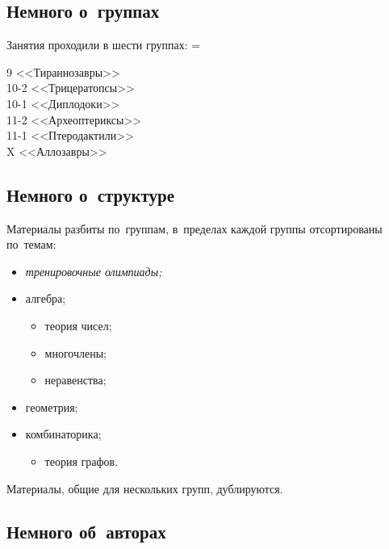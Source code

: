 


\begingroup
\providecommand\ifsourcelinks{\iffalse}
\providecommand\url{\texttt}

\strut

\vfill

\vfill

\strut

\clearpage


\subsection*{Немного о~группах}

Занятия проходили в шести группах:
\begingroup\multicolsep=\parskip
\begin{multicols}{3}
9    <<Тираннозавры>>
\\
10-2 <<Трицератопсы>>
\\
10-1 <<Диплодоки>>
\\
11-2 <<Археоптериксы>>
\\
11-1 <<Птеродактили>>
\\
X    <<Аллозавры>>
\end{multicols}
\endgroup


\subsection*{Немного о~структуре}

Материалы разбиты по~группам, в~пределах каждой группы отсортированы по~темам:
\begin{itemize}
    \item \emph{тренировочные олимпиады;}
    \item алгебра;
    \begin{itemize}
        \item теория чисел;
        \item многочлены;
        \item неравенства;
    \end{itemize}
    \item геометрия;
    \item комбинаторика;
    \begin{itemize}
        \item теория графов.
    \end{itemize}
\end{itemize}

Материалы, общие для нескольких групп, дублируются.
\ifsourcelinks
Все материалы сопровождаются ссылками на~исходные файлы \LaTeX.
\fi


\subsection*{Немного об~авторах}


\endgroup

